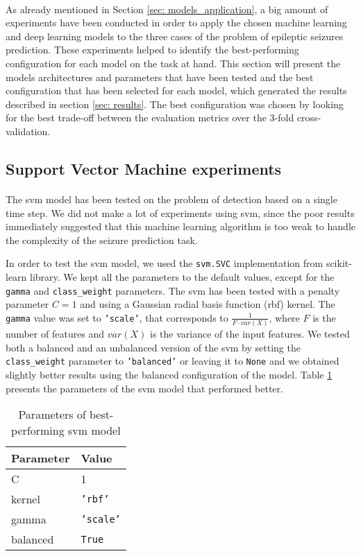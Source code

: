 \paragraph{} As already mentioned in Section \ref{sec: models_application}, a big amount of experiments have been conducted in order to apply the chosen machine learning and deep learning models to the three cases of the problem of epileptic seizures prediction. These experiments helped to identify the best-performing configuration for each model on the task at hand. This section will present the models architectures and parameters that have been tested and the best configuration that has been selected for each model, which generated the results described in section \ref{sec: results}. The best configuration was chosen by looking for the best trade-off between the evaluation metrics over the 3-fold cross-validation.

\subsection{Support Vector Machine experiments}
\paragraph{} The \acs{svm} model has been tested on the problem of detection based on a single time step. We did not make a lot of experiments using \acs{svm}, since the poor results immediately suggested that this machine learning algorithm is too weak to handle the complexity of the seizure prediction task.

In order to test the \acs{svm} model, we used the \texttt{svm.SVC} implementation from scikit-learn library. We kept all the parameters to the default values, except for the \texttt{gamma} and \texttt{class\_weight} parameters. The \acs{svm} has been tested with a penalty parameter $C=1$ and using a Gaussian radial basis function (\acs{rbf}) kernel. The \texttt{gamma} value was set to \texttt{'scale'}, that corresponds to $\frac{1}{F \cdot var(X)}$, where $F$ is the number of features and $var(X)$ is the variance of the input features. We tested both a balanced and an unbalanced version of the \acs{svm} by setting the \texttt{class\_weight} parameter to \texttt{'balanced'} or leaving it to \texttt{None} and we obtained slightly better results using the balanced configuration of the model. Table \ref{tab:svm_param} presents the parameters of the \acs{svm} model that performed better.
\begin{table}[htbp]
    \centering
    \begin{tabular}{ll}
        \hline
        \textbf{Parameter}  & \textbf{Value} \\\hline
        C                   & 1 \\
        kernel              & \texttt{'rbf'} \\
        gamma               & \texttt{'scale'} \\
        balanced            & \texttt{True}
    \end{tabular}
    \caption{Parameters of best-performing \acs{svm} model}
    \label{tab:svm_param}
\end{table}

